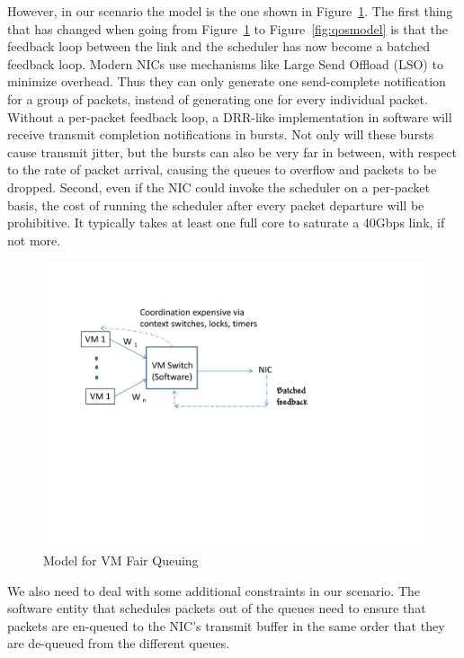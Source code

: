 However, in our scenario the model is the one shown in
Figure~\ref{fig:vmqosmodel}.  The first thing that has changed when going from
Figure~\ref{fig:vmqosmodel} to Figure~\ref{fig:qosmodel} is that the feedback
loop between the link and the scheduler has now become a batched feedback loop.
Modern NICs use mechanisms like Large Send Offload (LSO) to minimize overhead.
Thus they can only generate one send-complete notification for a group of
packets, instead of generating one for every individual packet.  Without a
per-packet feedback loop, a DRR-like implementation in software will receive
transmit completion notifications in bursts.  Not only will these bursts cause
transmit jitter, but the bursts can also be very far in between, with respect to
the rate of packet arrival, causing the queues to overflow and packets to be
dropped. Second, even if the NIC could invoke the scheduler on a per-packet
basis, the cost of running the scheduler after every packet departure will be
prohibitive. It typically takes at least one full core to saturate a 40Gbps link,
if not more. 
 
\begin{figure}
\centering
\includegraphics[width=\columnwidth, trim=6mm 90mm 20mm 10mm]{figures/vmqosmodel}
\caption{Model for VM Fair Queuing}
\label{fig:vmqosmodel}
\vspace{-3mm}
\end{figure}

We also need to deal with some additional constraints in our scenario.
The software entity that schedules packets out of the queues need to
ensure that packets are en-queued to the NIC's transmit buffer in the same order
that they are de-queued from the different queues.  


